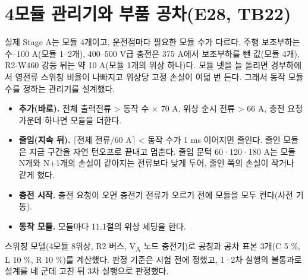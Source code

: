 \section{4모듈 관리기와 부품 공차(E28, TB22)}

실제 Stage A는 모듈 4개이고, 운전점마다 필요한 모듈 수가 다르다. 주행 보조부하는 수–100 A(모듈 1–2개), 400–500 V급 충전은 375 A에서 보조부하를 뺀 값(모듈 4개), R2-W460 강등 뒤는 약 10 A(모듈 1개의 위상 하나)다. 모듈 넷을 늘 돌리면 경부하에서 영전류 스위칭 비율이 나빠지고 위상당 고정 손실이 여덟 번 든다. 그래서 동작 모듈 수를 정하는 관리기를 설계했다.

\begin{itemize}
\item \textbf{추가(바로).} 전체 출력전류 > 동작 수 × 70 A, 위상 순시 전류 > 66 A, 충전 요청 가운데 하나면 모듈을 더한다.
\item \textbf{줄임(지속 뒤).} $\lceil$전체 전류/60 A$\rceil$ < 동작 수가 1 ms 이어지면 줄인다. 줄인 모듈은 지금 구간을 자연 턴오프로 끝내고 멈춘다. 줄임 문턱 60·120·180 A는 모듈 N개와 N+1개의 손실이 같아지는 전류보다 낮게 두어, 줄인 쪽의 손실이 작거나 같게 했다.
\item \textbf{충전 시작.} 충전 요청이 오면 충전기 전류가 오르기 전에 모듈을 모두 켠다(사전 기동).
\item \textbf{동작 모듈.} 모듈마다 11.1절의 위상 셰딩을 한다.
\end{itemize}

스위칭 모델(4모듈 8위상, R2 버스, V\textsubscript{A} 노드 충전기)로 공칭과 공차 표본 3개(C 5 \%, L 10 \%, R 10 \%)를 계산했다. 판정 기준은 시험 전에 정했고, 1·2차 실행의 불통과로 설계를 네 군데 고친 뒤 3차 실행으로 판정했다.


